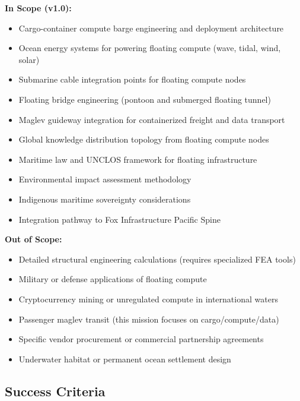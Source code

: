 \documentclass[11pt,letterpaper]{article}
\begin{document}
\textbf{In Scope (v1.0):}
\begin{itemize}[leftmargin=2em]
  \item Cargo-container compute barge engineering and deployment architecture
  \item Ocean energy systems for powering floating compute (wave, tidal, wind, solar)
  \item Submarine cable integration points for floating compute nodes
  \item Floating bridge engineering (pontoon and submerged floating tunnel)
  \item Maglev guideway integration for containerized freight and data transport
  \item Global knowledge distribution topology from floating compute nodes
  \item Maritime law and UNCLOS framework for floating infrastructure
  \item Environmental impact assessment methodology
  \item Indigenous maritime sovereignty considerations
  \item Integration pathway to Fox Infrastructure Pacific Spine
\end{itemize}

\textbf{Out of Scope:}
\begin{itemize}[leftmargin=2em]
  \item Detailed structural engineering calculations (requires specialized FEA tools)
  \item Military or defense applications of floating compute
  \item Cryptocurrency mining or unregulated compute in international waters
  \item Passenger maglev transit (this mission focuses on cargo/compute/data)
  \item Specific vendor procurement or commercial partnership agreements
  \item Underwater habitat or permanent ocean settlement design
\end{itemize}

\subsection{Success Criteria}
\end{document}
